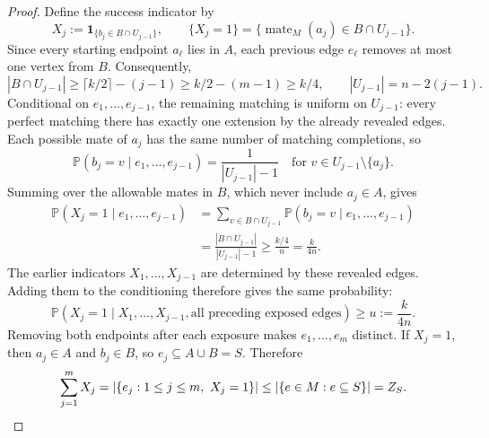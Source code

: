 \begin{proof}
Define the success indicator by
\[
 X_j:=\mathbf1_{\{b_j\in B\cap U_{j-1}\}},
 \qquad
 \{X_j=1\}=\{\operatorname{mate}_{M}(a_j)\in B\cap U_{j-1}\}.
\]
Since every starting endpoint \(a_\ell\) lies in \(A\), each previous
edge \(e_\ell\) removes at most one vertex from \(B\). Consequently,
\[
 |B\cap U_{j-1}|
 \ge\lceil k/2\rceil-(j-1)
 \ge k/2-(m-1)
 \ge k/4,
 \qquad
 |U_{j-1}|=n-2(j-1).
\]
Conditional on \(e_1,\ldots,e_{j-1}\), the remaining matching is uniform
on \(U_{j-1}\): every perfect matching there has exactly one extension
by the already revealed edges. Each possible mate of \(a_j\) has the same
number of matching completions, so
\[
 \mathbb P(b_j=v\mid e_1,\ldots,e_{j-1})
 =\frac1{|U_{j-1}|-1}
 \quad\text{for }v\in U_{j-1}\setminus\{a_j\}.
\]
Summing over the allowable mates in \(B\), which never include
\(a_j\in A\), gives
\begin{align*}
 \mathbb P(X_j=1\mid e_1,\ldots,e_{j-1})
 &=\sum_{v\in B\cap U_{j-1}}
   \mathbb P(b_j=v\mid e_1,\ldots,e_{j-1})\\
 &=\frac{|B\cap U_{j-1}|}{|U_{j-1}|-1}
 \ge\frac{k/4}{n}=\frac{k}{4n}.
\end{align*}
The earlier indicators \(X_1,\ldots,X_{j-1}\) are determined by these
revealed edges. Adding them to the conditioning therefore gives the same
probability:
\begin{equation}
 \mathbb P(X_j=1\mid X_1,\ldots,X_{j-1},
               \text{all preceding exposed edges})
 \ge u:=\frac{k}{4n}.
 \label{app:eq:matching-cross-success}
\end{equation}
Removing both endpoints after each exposure makes \(e_1,\ldots,e_m\)
distinct. If \(X_j=1\), then \(a_j\in A\) and \(b_j\in B\), so
\(e_j\subseteq A\cup B=S\). Therefore
\[
 \sum_{j=1}^mX_j
 =|\{e_j:1\le j\le m,\ X_j=1\}|
 \le|\{e\in M:e\subseteq S\}|=Z_{S}.
\]


\end{proof}
